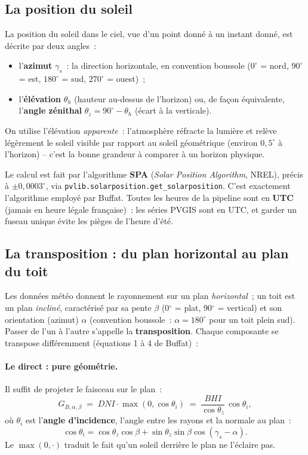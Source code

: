\documentclass[11pt,a4paper]{article}
\newcommand{\fonction}[1]{\texttt{#1}}
\begin{document}
\subsection{La position du soleil}
\label{sec:soleil}

La position du soleil dans le ciel, vue d'un point donné à un instant donné, est
décrite par deux angles~:
\begin{itemize}
  \item l'\textbf{azimut} $\gamma_s$~: la direction horizontale, en convention
    boussole ($0^\circ$ = nord, $90^\circ$ = est, $180^\circ$ = sud,
    $270^\circ$ = ouest)~;
  \item l'\textbf{élévation} $\theta_h$ (hauteur au-dessus de l'horizon) ou,
    de façon équivalente, l'\textbf{angle zénithal} $\theta_z = 90^\circ - \theta_h$
    (écart à la verticale).
\end{itemize}

On utilise l'élévation \emph{apparente}~: l'atmosphère réfracte la lumière et
relève légèrement le soleil visible par rapport au soleil géométrique (environ
$0{,}5^\circ$ à l'horizon) -- c'est la bonne grandeur à comparer à un horizon
physique.

Le calcul est fait par l'algorithme \textbf{SPA} (\emph{Solar Position
Algorithm}, NREL), précis à $\pm 0{,}0003^\circ$, via
\fonction{pvlib.solarposition.get\_solarposition}. C'est exactement l'algorithme
employé par Buffat. Toutes les heures de la pipeline sont en \textbf{UTC}
(jamais en heure légale française)~: les séries PVGIS sont en UTC, et garder un
fuseau unique évite les pièges de l'heure d'été.

\subsection{La transposition : du plan horizontal au plan du toit}
\label{sec:transposition}

Les données météo donnent le rayonnement sur un plan \emph{horizontal}~; un toit
est un plan \emph{incliné}, caractérisé par sa pente $\beta$ (0$^\circ$ = plat,
90$^\circ$ = vertical) et son orientation (azimut) $\alpha$ (convention
boussole~: $\alpha = 180^\circ$ pour un toit plein sud). Passer de l'un à
l'autre s'appelle la \textbf{transposition}. Chaque composante se transpose
différemment (équations 1 à 4 de Buffat)~:

\paragraph{Le direct : pure géométrie.} Il suffit de projeter le faisceau sur le
plan~:
\begin{equation}
  G_{B,\alpha,\beta} \;=\; DNI \cdot \max(0, \cos\theta_i)
  \;=\; \frac{BHI}{\cos\theta_z}\,\cos\theta_i ,
  \label{eq:beam}
\end{equation}
où $\theta_i$ est l'\textbf{angle d'incidence}, l'angle entre les rayons et la
normale au plan~:
\begin{equation}
  \cos\theta_i = \cos\theta_z\cos\beta
              + \sin\theta_z\sin\beta\cos(\gamma_s - \alpha).
\end{equation}
Le $\max(0,\cdot)$ traduit le fait qu'un soleil derrière le plan ne l'éclaire pas.
\end{document}
